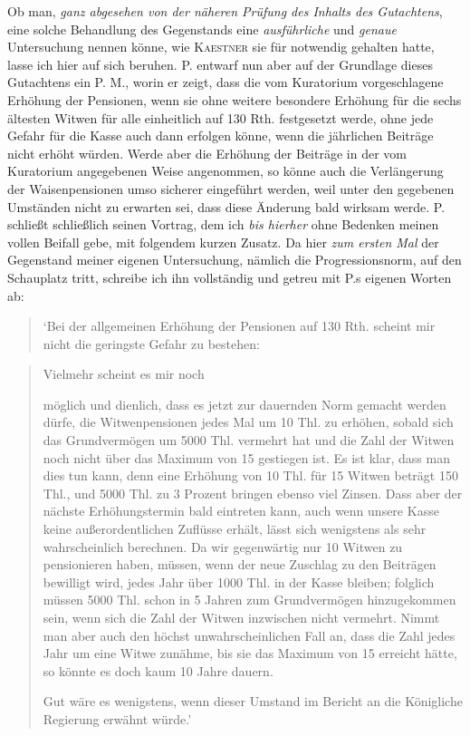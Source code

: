 Ob man, \textit{ganz abgesehen von der näheren Prüfung des Inhalts des Gutachtens}, eine solche Behandlung des Gegenstands eine \textit{ausführliche} und \textit{genaue} Untersuchung nennen könne, wie \textsc{Kaestner} sie für notwendig gehalten hatte, lasse ich hier auf sich beruhen. P. entwarf nun aber auf der Grundlage dieses Gutachtens ein P. M., worin er zeigt, dass die vom Kuratorium vorgeschlagene Erhöhung der Pensionen, wenn sie ohne weitere besondere Erhöhung für die sechs ältesten Witwen für alle einheitlich auf 130 Rth. festgesetzt werde, ohne jede Gefahr für die Kasse auch dann erfolgen könne, wenn die jährlichen Beiträge nicht erhöht würden. Werde aber die Erhöhung der Beiträge in der vom Kuratorium angegebenen Weise angenommen, so könne auch die Verlängerung der Waisenpensionen umso sicherer eingeführt werden, weil unter den gegebenen Umständen nicht zu erwarten sei, dass diese Änderung bald wirksam werde. P. schließt schließlich seinen Vortrag, dem ich \textit{bis hierher} ohne Bedenken meinen vollen Beifall gebe, mit folgendem kurzen Zusatz. Da hier \textit{zum ersten Mal} der Gegenstand meiner eigenen Untersuchung, nämlich die Progressionsnorm, auf den Schauplatz tritt, schreibe ich ihn vollständig und getreu mit P.s eigenen Worten ab:

\begin{quote}
‘Bei der allgemeinen Erhöhung der Pensionen auf 130 Rth. scheint mir nicht die geringste Gefahr zu bestehen:
\end{quote}
\begin{quote}
Vielmehr scheint es mir noch
\begin{list}{}{\setlength{\leftmargin}{1.8em}\setlength{\labelwidth}{1.4em}\setlength{\labelsep}{.4em}}
\item[3)] möglich und dienlich, dass es jetzt zur dauernden Norm gemacht werden dürfe, die Witwenpensionen jedes Mal um 10 Thl. zu erhöhen, sobald sich das Grundvermögen um 5000 Thl. vermehrt hat und die Zahl der Witwen noch nicht über das Maximum von 15 gestiegen ist. Es ist klar, dass man dies tun kann, denn eine Erhöhung von 10 Thl. für 15 Witwen beträgt 150 Thl., und 5000 Thl. zu 3 Prozent bringen ebenso viel Zinsen. Dass aber der nächste Erhöhungstermin bald eintreten kann, auch wenn unsere Kasse keine außerordentlichen Zuflüsse erhält, lässt sich wenigstens als sehr wahrscheinlich berechnen. Da wir gegenwärtig nur 10 Witwen zu pensionieren haben, müssen, wenn der neue Zuschlag zu den Beiträgen bewilligt wird, jedes Jahr über 1000 Thl. in der Kasse bleiben; folglich müssen 5000 Thl. schon in 5 Jahren zum Grundvermögen hinzugekommen sein, wenn sich die Zahl der Witwen inzwischen nicht vermehrt. Nimmt man aber auch den höchst unwahrscheinlichen Fall an, dass die Zahl jedes Jahr um eine Witwe zunähme, bis sie das Maximum von 15 erreicht hätte, so könnte es doch kaum 10 Jahre dauern.
\end{list}
Gut wäre es wenigstens, wenn dieser Umstand im Bericht an die Königliche Regierung erwähnt würde.’
\end{quote}

